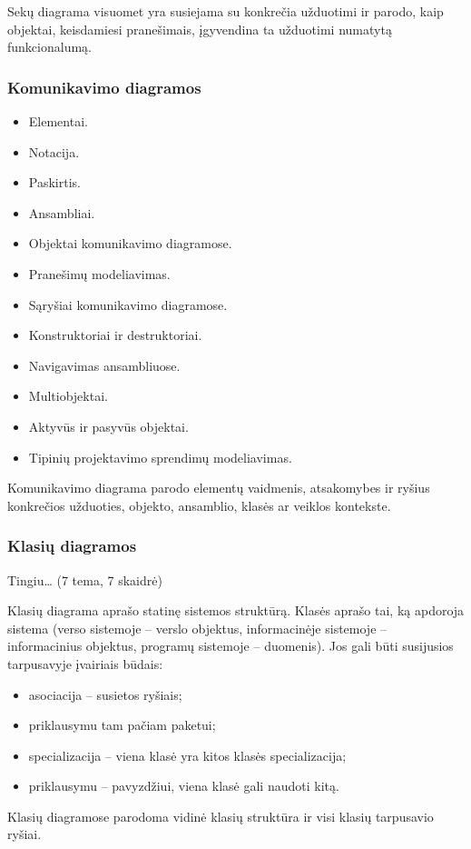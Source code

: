 Sekų diagrama visuomet yra susiejama su konkrečia užduotimi ir parodo, kaip
objektai, keisdamiesi pranešimais, įgyvendina ta užduotimi numatytą
funkcionalumą.



\subsubsection{Komunikavimo diagramos}

\begin{itemize}
  \item Elementai.
  \item Notacija.
  \item Paskirtis.
  \item Ansambliai.
  \item Objektai komunikavimo diagramose.
  \item Pranešimų modeliavimas.
  \item Sąryšiai komunikavimo diagramose.
  \item Konstruktoriai ir destruktoriai.
  \item Navigavimas ansambliuose.
  \item Multiobjektai.
  \item Aktyvūs ir pasyvūs objektai.
  \item Tipinių projektavimo sprendimų modeliavimas.
\end{itemize}


Komunikavimo diagrama parodo elementų vaidmenis, atsakomybes ir ryšius
konkrečios užduoties, objekto, ansamblio, klasės ar veiklos kontekste.



\subsubsection{Klasių diagramos}

Tingiu… (7 tema, 7 skaidrė)


Klasių diagrama aprašo statinę sistemos struktūrą. Klasės aprašo tai,
ką apdoroja sistema (verso sistemoje – verslo objektus, informacinėje
sistemoje – informacinius objektus, programų sistemoje – duomenis).
Jos gali būti susijusios tarpusavyje įvairiais būdais:
\begin{itemize}
  \item asociacija – susietos ryšiais;
  \item priklausymu tam pačiam paketui;
  \item specializacija – viena klasė yra kitos klasės specializacija;
  \item priklausymu – pavyzdžiui, viena klasė gali naudoti kitą.
\end{itemize}
Klasių diagramose parodoma vidinė klasių struktūra ir visi klasių
tarpusavio ryšiai.

